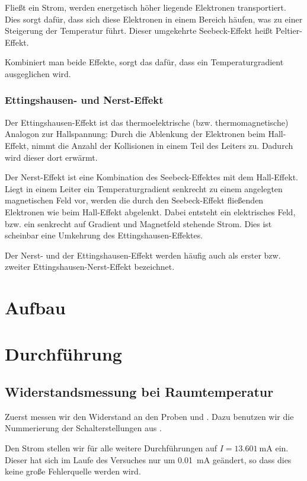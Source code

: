 Fließt ein Strom, werden energetisch höher liegende Elektronen transportiert.
Dies sorgt dafür, dass sich diese Elektronen in einem Bereich häufen, was zu
einer Steigerung der Temperatur führt. Dieser umgekehrte Seebeck-Effekt heißt
Peltier-Effekt.

Kombiniert man beide Effekte, sorgt das dafür, dass ein Temperaturgradient
ausgeglichen wird.

\subsection{Ettingshausen- und Nerst-Effekt}

Der Ettingshausen-Effekt ist das thermoelektrische (bzw. thermomagnetische)
Analogon zur Hallspannung: Durch die Ablenkung der Elektronen beim Hall-Effekt,
nimmt die Anzahl der Kollisionen in einem Teil des Leiters zu. Dadurch wird
dieser dort erwärmt.

Der Nerst-Effekt ist eine Kombination des Seebeck-Effektes mit dem Hall-Effekt.
Liegt in einem Leiter ein Temperaturgradient senkrecht zu einem angelegten
magnetischen Feld vor, werden die durch den Seebeck-Effekt fließenden
Elektronen wie beim Hall-Effekt abgelenkt. Dabei entsteht ein elektrisches
Feld, bzw. ein senkrecht auf Gradient und Magnetfeld stehende Strom. Dies ist
scheinbar eine Umkehrung des Ettingshausen-Effektes.

Der Nerst- und der Ettingshausen-Effekt werden häufig auch als erster bzw.
zweiter Ettingshausen-Nerst-Effekt bezeichnet.
\FloatBarrier
\chapter{Aufbau}

\FloatBarrier
\chapter{Durchführung}

\section{Widerstandsmessung bei Raumtemperatur}

Zuerst messen wir den Widerstand an den Proben \probeA{} und \probeB. Dazu
benutzen wir die Nummerierung der Schalterstellungen aus
\cite[Tab.~4.1]{heldt/Diplomarbeit}.

Den Strom stellen wir für alle weitere Durchführungen auf $I =
\SI{13.601}{\milli\ampere}$ ein. Dieser hat sich im Laufe des Versuches nur um
\SI{0.01}{\milli\ampere} geändert, so dass dies keine große Fehlerquelle
werden wird.

